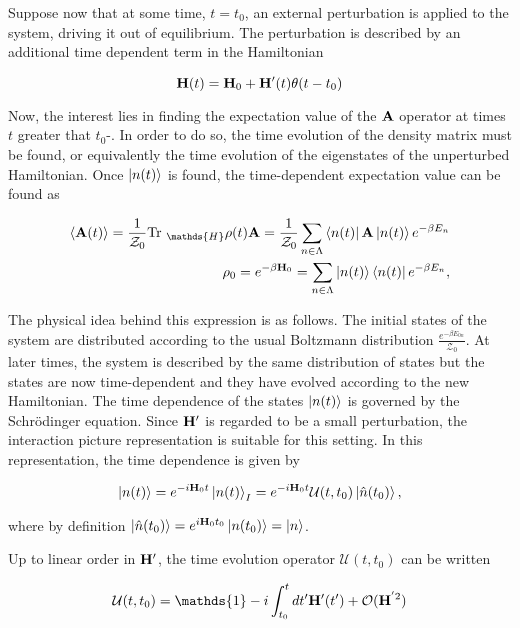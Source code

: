 \documentclass{homework}
\begin{document}
Suppose now that at some time, $t = t_0$, an external perturbation is applied to the system, driving it out of equilibrium. The perturbation is described by an additional time dependent term in the Hamiltonian 

\begin{equation}
    {\bf H}(t) = {\bf H}_0 + {\bf H}'(t) \theta(t-t_0)
\end{equation}

Now, the interest lies in finding the expectation value of the ${\bf A}$ operator at times $t$ greater that $t_0$-. In order to do so, the time evolution of the density matrix must be found, or equivalently the time evolution of the eigenstates of the unperturbed Hamiltonian. Once $\ket{n(t)}$ is found, the time-dependent expectation value can be found as 

\begin{align}
        \langle {\bf A}(t) \rangle = \frac{1}{\mathcal{Z}_0} \textnormal{Tr }_{\mathds{H}} \rho(t) {\bf A}  = \frac{1}{\mathcal{Z}_0} \sum_{n \in \Lambda} \bra{n(t)} {{\bf A}} \ket{n(t)} e^{-\beta E_n} \\
        \rho_0 = e^{-\beta {\bf H}_0} = \sum_{n \in \Lambda} \ket{n(t)} \bra{n(t)} e^{-\beta E_n},
\end{align}

The physical idea behind this expression is as follows. The initial states of the system are distributed according to the usual Boltzmann distribution $\frac{e^{-\beta E_{0n}}}{\mathcal{Z_0}}$. At later times, the system is described by the same distribution of states but the states are now time-dependent and they have evolved according to the new Hamiltonian. The time dependence of the states $\ket{n(t)}$ is governed by the Schr\"odinger equation. Since ${\bf H}'$ is regarded to be a small perturbation, the interaction picture representation is suitable for this setting. In this representation, the time dependence is given by 

\begin{equation}
    \ket{n(t)} = e^{-i{\bf H}_0 t} \ket{n(t)}_I = e^{-i{\bf H}_0 t} \mathcal{U}(t, t_0) \ket{\hat{n}(t_0)},
\end{equation}

where by definition $\ket{\hat{n}(t_0)} = e^{i {\bf H}_0 t_0} \ket{n(t_0)} = \ket{n}$.

Up to linear order in ${\bf H}'$, the time evolution operator $\mathcal{U}(t, t_0)$ can be written 

$$
    \mathcal{U}(t, t_0) = \mathds{1} - i \int_{t_0}^t dt' \Hamiltonian'(t') + \mathcal{O}(\Hamiltonian^{'2})
$$
\end{document}

